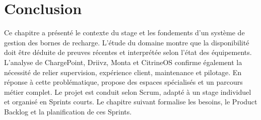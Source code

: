 \section*{Conclusion}

Ce chapitre a présenté le contexte du stage et les fondements d'un système de gestion
des bornes de recharge. L'étude du domaine montre que la disponibilité doit être
déduite de preuves récentes et interprétée selon l'état des équipements. L'analyse de
ChargePoint, Driivz, Monta et CitrineOS confirme également la nécessité de relier
supervision, expérience client, maintenance et pilotage. En réponse à cette
problématique, \ProjectName{} propose des espaces spécialisés et un parcours métier
complet. Le projet est conduit selon Scrum, adapté à un stage individuel et organisé
en Sprints courts. Le chapitre suivant formalise les besoins, le Product Backlog et
la planification de ces Sprints.
